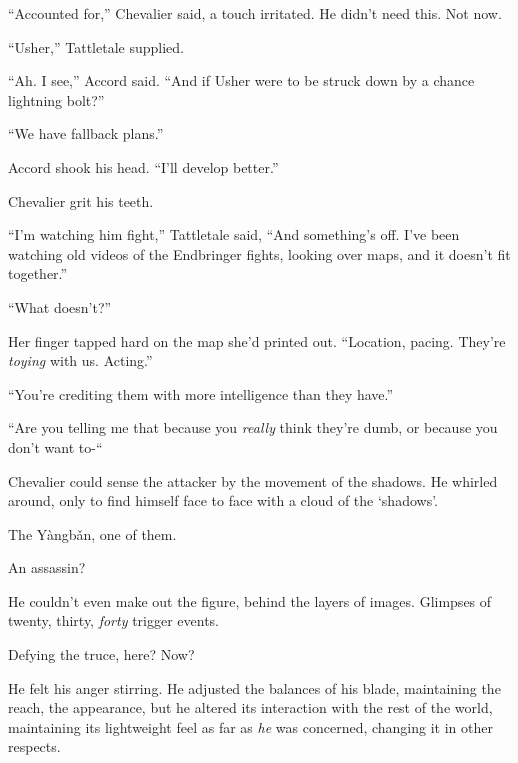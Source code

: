 ``Accounted for,'' Chevalier said, a touch irritated.  He didn't need this.  Not now.



``Usher,'' Tattletale supplied.



``Ah.  I see,'' Accord said.  ``And if Usher were to be struck down by a chance lightning bolt?''



``We have fallback plans.''



Accord shook his head.  ``I'll develop better.''



Chevalier grit his teeth.



``I'm watching him fight,'' Tattletale said, ``And something's off.  I've been watching old videos of the Endbringer fights, looking over maps, and it doesn't fit together.''



``What doesn't?''



Her finger tapped hard on the map she'd printed out.  ``Location, pacing.  They're \emph{toying} with us.  Acting.''



``You're crediting them with more intelligence than they have.''



``Are you telling me that because you \emph{really} think they're dumb, or because you don't want to-``



Chevalier could sense the attacker by the movement of the shadows.  He whirled around, only to find himself face to face with a cloud of the `shadows'.



The Y\`{a}ngb\v{a}n, one of them.



An assassin?



He couldn't even make out the figure, behind the layers of images.  Glimpses of twenty, thirty, \emph{forty} trigger events.



Defying the truce, here?  Now?



He felt his anger stirring.  He adjusted the balances of his blade, maintaining the reach, the appearance, but he altered its interaction with the rest of the world, maintaining its lightweight feel as far as \emph{he} was concerned, changing it in other respects.



